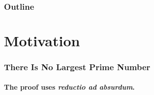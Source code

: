 \documentclass{beamer}
\begin{document}
    \begin{frame}
        \frametitle{Outline}
        \tableofcontents
    \end{frame}

    \section{Motivation}

    \begin{frame}
        \frametitle{There Is No Largest Prime Number}
        \framesubtitle{The proof uses \textit{reductio ad absurdum}.}
    \end{frame}
\end{document}
